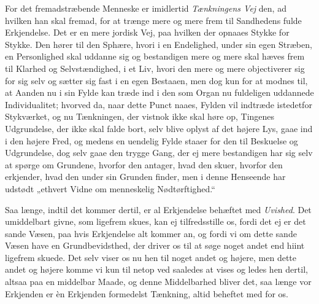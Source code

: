 \documentclass[12pt,a4paper]{book}
\newcommand{\apage}[1]{\marginnote{\footnotesize\textit{[#1]}}}
\begin{document}
For det fremadstræbende Menneske er imidlertid \emph{Tænkningens Vej} den, ad
hvilken han skal fremad, for at trænge mere og mere frem til Sandhedens fulde
Erkjendelse. Det er en mere jordisk Vej, paa hvilken der opnaaes Stykke for
Stykke. Den hører til den Sphære, hvori i en Endelighed, under sin egen Stræben,
en Personlighed skal uddanne sig og bestandigen mere og mere skal hæves frem til
Klarhed og Selvstændighed, i et Liv, hvori den mere og mere objectiverer sig for
sig selv og sætter sig fast i en egen Bestaaen, men dog kun for at modnes til, at
Aanden nu i sin Fylde kan træde ind i den som Organ nu fuldeligen uddannede
Individualitet; hvorved da, naar dette Punct naaes, Fylden vil indtræde
istedetfor Stykværket, og nu Tænkningen, der vistnok ikke skal høre op, Tingenes
Udgrundelse, der ikke skal falde bort, selv blive oplyst af det højere Lys, gaae
ind i den højere Fred, og medens en uendelig Fylde staaer for den til Beskuelse
og Udgrundelse, dog selv gaae den trygge Gang, der ej mere bestandigen har sig
selv at spørge om Grundene, hvorfor den antager, hvad den skuer, hvorfor den
erkjender, hvad den under sin Grunden finder, men i denne  \apage{43} Henseende har udstødt
„ethvert Vidne om menneskelig Nødtørftighed.“

Saa længe, indtil det kommer dertil, er al Erkjendelse behæftet med
\emph{Uvished}. Det umiddelbart givne, som ligefrem skues, kan ej tilfredsstille
os, fordi det ej er det sande Væsen, paa hvis Erkjendelse alt kommer an, og fordi
vi om dette sande Væsen have en Grundbevidsthed, der driver os til at søge noget
andet end hiint ligefrem skuede. Det selv viser os nu hen til noget andet og
højere, men dette andet og højere komme vi kun til netop ved saaledes at vises og
ledes hen dertil, altsaa paa en middelbar Maade, og denne Middelbarhed bliver
det, saa længe vor Erkjenden er èn Erkjenden formedelst Tænkning, altid beheftet
med for os.
\end{document}
